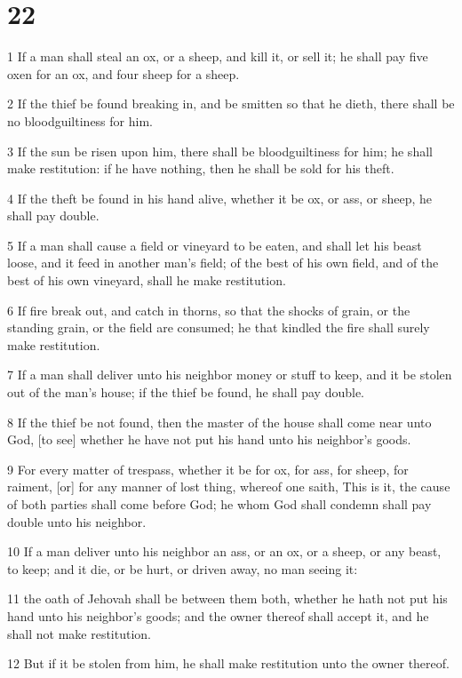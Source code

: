 \chapter{22}

\par 1 If a man shall steal an ox, or a sheep, and kill it, or sell it; he shall pay five oxen for an ox, and four sheep for a sheep.
\par 2 If the thief be found breaking in, and be smitten so that he dieth, there shall be no bloodguiltiness for him.
\par 3 If the sun be risen upon him, there shall be bloodguiltiness for him; he shall make restitution: if he have nothing, then he shall be sold for his theft.
\par 4 If the theft be found in his hand alive, whether it be ox, or ass, or sheep, he shall pay double.
\par 5 If a man shall cause a field or vineyard to be eaten, and shall let his beast loose, and it feed in another man's field; of the best of his own field, and of the best of his own vineyard, shall he make restitution.
\par 6 If fire break out, and catch in thorns, so that the shocks of grain, or the standing grain, or the field are consumed; he that kindled the fire shall surely make restitution.
\par 7 If a man shall deliver unto his neighbor money or stuff to keep, and it be stolen out of the man's house; if the thief be found, he shall pay double.
\par 8 If the thief be not found, then the master of the house shall come near unto God, [to see] whether he have not put his hand unto his neighbor's goods.
\par 9 For every matter of trespass, whether it be for ox, for ass, for sheep, for raiment, [or] for any manner of lost thing, whereof one saith, This is it, the cause of both parties shall come before God; he whom God shall condemn shall pay double unto his neighbor.
\par 10 If a man deliver unto his neighbor an ass, or an ox, or a sheep, or any beast, to keep; and it die, or be hurt, or driven away, no man seeing it:
\par 11 the oath of Jehovah shall be between them both, whether he hath not put his hand unto his neighbor's goods; and the owner thereof shall accept it, and he shall not make restitution.
\par 12 But if it be stolen from him, he shall make restitution unto the owner thereof.
